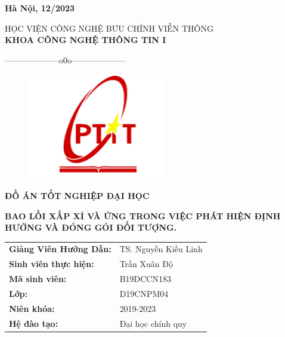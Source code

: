 \documentclass[12pt,a4paper,openany,oneside]{report}
\begin{document}
\begin{titlepage}
\vfill
\begin{center}
{{\bf Hà Nội, 12/2023}}
\end{center}
\end{titlepage}

\setlength{\fboxrule}{1.5pt}
\thisfancypage{\setlength{\fboxsep}{10pt}\setlength{\shadowsize}{0pt}\doublebox}{}

\fontsize{14pt}{14pt}\selectfont \baselineskip 0.65cm
\thispagestyle{empty}
\begin{center}
	{HỌC VIỆN CÔNG NGHỆ BƯU CHÍNH VIỄN THÔNG}\\
	\textbf{\MakeUppercase{KHOA CÔNG NGHỆ THÔNG TIN I}}\\
	\centerline{--------------------o0o--------------------}  
\end{center}


\begin{figure}[H]
	\begin{center}
		\includegraphics[width=6cm]{./logo}
	\end{center}
\end{figure} 



\vspace{0.5cm}
\begin{center}
	\textbf{\MakeUppercase{\Large \bf ĐỒ ÁN TỐT NGHIỆP ĐẠI HỌC}}\\ 
\end{center} 

\vspace{1cm}
\begin{center}
	\textbf{\MakeUppercase{ \bf Bao lồi xấp xỉ và ứng trong việc phát hiện định hướng và đóng gói đối tượng.}}\\ 
\end{center} 
\vspace{2cm}


\begin{tabular}{ll}
	{\textbf{\large{Giảng Viên Hướng Dẫn: }}} & {\large TS. Nguyễn Kiều Linh}\\
	{\textbf{\large{Sinh viên thực hiện:}}}  & {\large Trần Xuân Độ} \\
	{\textbf{\large{Mã sinh viên: }}}  & {\large B19DCCN183} \\
	{\textbf{\large{Lớp:}}}   & {\large D19CNPM04}\\
	{\textbf{\large{Niên khóa:}}}   & {\large 2019-2023}\\
	{\textbf{\large{Hệ đào tạo:}}}   & {\large Đại học chính quy}
\end{tabular}
\end{document}
